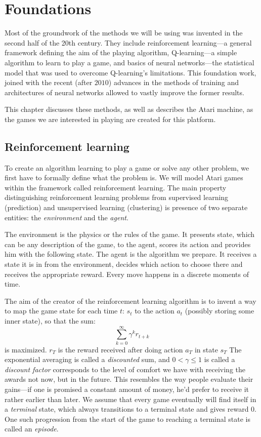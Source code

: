 \chapter{Foundations}\label{foundations}
Most of the groundwork of the methods we will be using was invented in the second half of the 20th century. They include reinforcement learning---a general framework defining the aim of the playing algorithm, Q-learning---a simple algorithm to learn to play a game, and basics of neural networks---the statistical model that was used to overcome Q-learning's limitations.
This foundation work, joined with the recent (after $2010$) advances in the methods of training and architectures of neural networks allowed to vastly improve the former results.

This chapter discusses these methods, as well as describes the Atari machine, as the games we are interested in playing are created for this platform.

\section{Reinforcement learning}
To create an algorithm learning to play a game or solve any other problem, we first have to formally define what the problem is. We will model Atari games within the framework called reinforcement learning. The main property distinguishing reinforcement learning problems from supervised learning (prediction) and unsupervised learning (clustering) is presence of two separate entities: the \emph{environment} and the \emph{agent}.

The environment is the physics or the rules of the game. It presents state, which can be any description of the game, to the agent, scores its action and provides him with the following state.
The agent is the algorithm we prepare. It receives a state it is in from the environment, decides which action to choose there and receives the appropriate reward. Every move happens in a discrete moments of time.

The aim of the creator of the reinforcement learning algorithm is to invent a way to map the game state for each time $t$: $s_t$ to the action $a_t$ (possibly storing some inner state), so that the sum:
\begin{equation} \label{discounted-reward}
\sum_{k=0}^{\infty} \gamma^k r_{t + k}
\end{equation}
is maximized. $r_T$ is the reward received after doing action $a_T$ in state $s_T$ The exponential averaging is called a \emph{discounted} sum, and $0 < \gamma \le 1$ is called a \emph{discount factor} corresponds to the level of comfort we have with receiving the awards not now, but in the future. This resembles the way people evaluate their gains---if one is promised a constant amount of money, he'd prefer to receive it rather earlier than later. We assume that every game eventually will find itself in a \emph{terminal} state, which always transitions to a terminal state and gives reward $0$. One such progression from the start of the game to reaching a terminal state is called an \emph{episode}.

